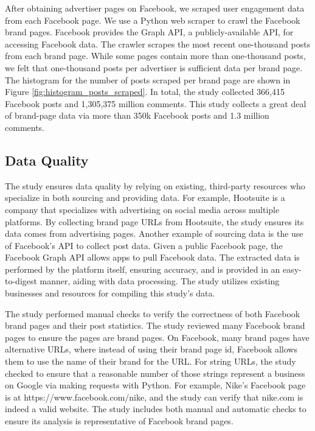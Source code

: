 \documentclass[mksc,blindrev]{informs3} %
\begin{document}
After obtaining advertiser pages on Facebook, we scraped user engagement data from each Facebook page. We use a Python web scraper to crawl the Facebook brand pages. Facebook provides the Graph API, a publicly-available API, for accessing Facebook data. The crawler scrapes the most recent one-thousand posts from each brand page. While some pages contain more than one-thousand posts, we felt that one-thousand posts per advertiser is sufficient data per brand page. The histogram for the number of posts scraped per brand page are shown in Figure \ref{fig:histogram_posts_scraped}. In total, the study collected 366,415 Facebook posts and 1,305,375 million comments. This study collects a great deal of brand-page data via more than 350k Facebook posts and 1.3 million comments.

\subsection{Data Quality}

The study ensures data quality by relying on existing, third-party resources who specialize in both sourcing and providing data. For example, Hootsuite is a company that specializes with advertising on social media across multiple platforms. By collecting brand page URLs from Hootsuite, the study ensures its data comes from advertising pages. Another example of sourcing data is the use of Facebook's API to collect post data. Given a public Facebook page, the Facebook Graph API allows apps to pull Facebook data. The extracted data is performed by the platform itself, ensuring accuracy, and is provided in an easy-to-digest manner, aiding with data processing. The study utilizes existing businesses and resources for compiling this study's data.

The study performed manual checks to verify the correctness of both Facebook brand pages and their post statistics. The study reviewed many Facebook brand pages to ensure the pages are brand pages. On Facebook, many brand pages have alternative URLs, where instead of using their brand page id, Facebook allows them to use the name of their brand for the URL. For string URLs, the study checked to ensure that a reasonable number of those strings represent a business on Google via making requests with Python. For example, Nike's Facebook page is at https://www.facebook.com/nike, and the study can verify that nike.com is indeed a valid website. The study includes both manual and automatic checks to ensure its analysis is representative of Facebook brand pages.
\end{document}
